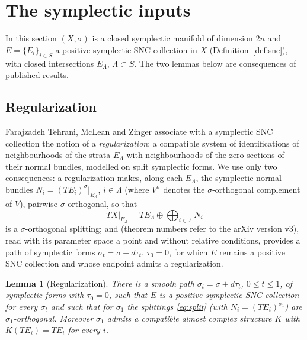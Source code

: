 \documentclass[11pt]{article}
\newtheorem{lemma}[theorem]{Lemma}
\theoremstyle{remark}
\begin{document}
\section{The symplectic inputs}\label{sec:inputs}

In this section $(X,\sigma)$ is a closed symplectic manifold of
dimension $2n$ and $E=\{E_i\}_{i\in S}$ a positive symplectic SNC
collection in $X$ (Definition~\ref{def:snc}), with closed intersections
$E_\Lambda$, $\Lambda\subset S$. The two lemmas below are consequences
of published results.

\subsection{Regularization}

Farajzadeh Tehrani, McLean and Zinger \cite{FMZ} associate with a
symplectic SNC collection the notion of a \emph{regularization}: a
compatible system of identifications of neighbourhoods of the strata
$E_\Lambda$ with neighbourhoods of the zero sections of their normal
bundles, modelled on split symplectic forms. We use only two
consequences: a regularization makes, along each $E_\Lambda$, the
symplectic normal bundles $N_i=(TE_i)^{\sigma}|_{E_\Lambda}$,
$i\in\Lambda$ (where $V^\sigma$ denotes the $\sigma$-orthogonal
complement of $V$), pairwise $\sigma$-orthogonal, so that
\begin{equation}\label{eq:split}
 TX|_{E_\Lambda}=TE_\Lambda\oplus\bigoplus_{i\in\Lambda}N_i
\end{equation}
is a $\sigma$-orthogonal splitting; and \cite[Theorem 2.13]{FMZ}
(theorem numbers refer to the arXiv version v3), read with its
parameter space a point and without relative conditions, provides a
path of symplectic forms $\sigma_t=\sigma+d\tau_t$, $\tau_0=0$, for which
$E$ remains a positive SNC collection and whose endpoint admits a
regularization.

\begin{lemma}[Regularization]\label{lem:reg}
There is a smooth path $\sigma_t=\sigma+d\tau_t$, $0\le t\le1$, of
symplectic forms with $\tau_0=0$, such that $E$ is a positive symplectic
SNC collection for every $\sigma_t$ and such that for $\sigma_1$ the
splittings \eqref{eq:split} (with $N_i=(TE_i)^{\sigma_1}$) are
$\sigma_1$-orthogonal. Moreover $\sigma_1$ admits a compatible almost
complex structure $K$ with $K(TE_i)=TE_i$ for every $i$.
\end{lemma}
\end{document}
